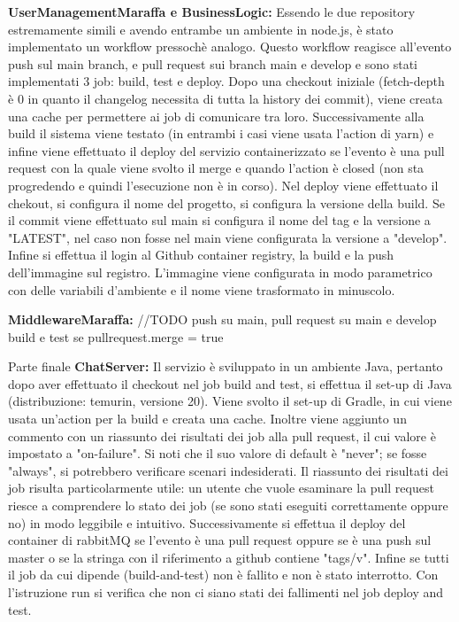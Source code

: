 \textbf{UserManagementMaraffa e BusinessLogic:} Essendo le due repository estremamente simili e avendo entrambe un ambiente in node.js, è stato implementato un workflow pressochè analogo. Questo workflow reagisce all'evento push sul main branch, e pull request sui branch main e develop 
e sono stati implementati 3 job: build, test e deploy.
Dopo una checkout iniziale (fetch-depth è 0 in quanto il changelog necessita di tutta la history dei commit), viene creata una cache per permettere ai job di comunicare tra loro. Successivamente alla build il sistema viene testato (in entrambi i casi viene usata l'action di yarn) e infine viene effettuato il deploy del servizio containerizzato se l'evento è una pull request con la quale viene svolto il merge e quando l'action è closed (non sta progredendo e quindi l'esecuzione non è in corso). Nel deploy viene effettuato il chekout, si configura il nome del progetto, si configura la versione della build. Se il commit viene effettuato sul main si configura il nome del tag e la versione a "LATEST", nel caso non fosse nel main viene configurata la versione a "develop". Infine si effettua il login al Github container registry, la build e la push dell'immagine sul registro. L'immagine viene configurata in modo parametrico con delle variabili d'ambiente e il nome viene trasformato in minuscolo. 

\textbf{MiddlewareMaraffa:} //TODO
push su main, pull request su main e develop
build e test se pullrequest.merge = true 

Parte finale 
\textbf{ChatServer:} Il servizio è sviluppato in un ambiente Java, pertanto dopo aver effettuato il checkout nel job build and test,  si effettua il set-up di Java (distribuzione: temurin, versione 20). Viene svolto il set-up di Gradle, in cui viene usata un'action per la build e creata una cache. Inoltre viene aggiunto un commento con un riassunto dei risultati dei job  alla pull request, il cui valore è impostato a "on-failure". Si noti che il suo valore di default è "never"; se fosse "always", si potrebbero verificare scenari indesiderati. Il riassunto dei risultati dei job risulta particolarmente utile: un utente che vuole esaminare la pull request riesce a comprendere lo stato dei job (se sono stati eseguiti correttamente oppure no) in modo leggibile e intuitivo. Successivamente si effettua il deploy del container di rabbitMQ se l'evento è una pull request oppure se è una push sul master o se la stringa con il riferimento a github contiene "tags/v". Infine se tutti il job da cui dipende (build-and-test) non è fallito e non è stato interrotto. Con l'istruzione run si verifica che non ci siano stati dei fallimenti nel job deploy and test.

